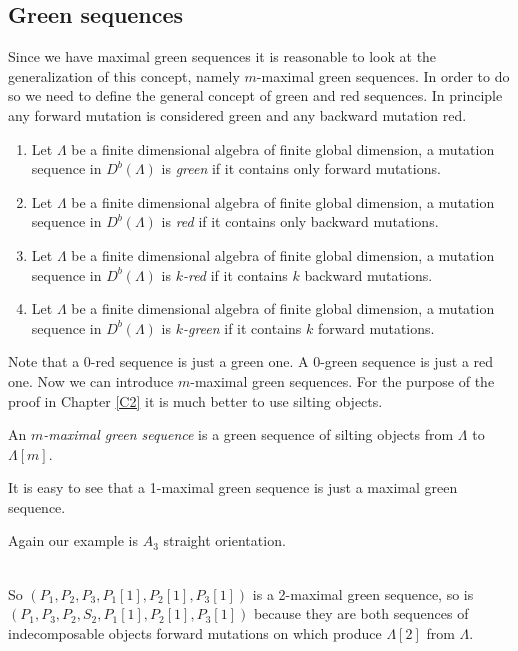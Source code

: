 \subsection{Green sequences}
\indent Since we have maximal green sequences it is reasonable to look at the generalization of this concept, namely $m$-maximal green sequences. In order to do so we need to define the general concept of green and red sequences. In principle any forward mutation is considered green and any backward mutation red.\\
\begin{definition}
\begin{enumerate}
\item Let $\Lambda$ be a finite dimensional algebra of finite global dimension, a mutation sequence in $D^b(\Lambda)$ is \textit{green} if it contains only forward mutations. 
\item Let $\Lambda$ be a finite dimensional algebra of finite global dimension, a mutation sequence in $D^b(\Lambda)$ is \textit{red} if it contains only backward mutations. 
\item Let $\Lambda$ be a finite dimensional algebra of finite global dimension, a mutation sequence in $D^b(\Lambda)$ is \textit{$k$-red} if it contains $k$ backward mutations. 
\item Let $\Lambda$ be a finite dimensional algebra of finite global dimension, a mutation sequence in $D^b(\Lambda)$ is \textit{$k$-green} if it contains $k$ forward mutations.
\end{enumerate}
\end{definition}
\indent Note that a $0$-red sequence is just a green one. A $0$-green sequence is just a red one. Now we can introduce $m$-maximal green sequences. For the purpose of the proof in Chapter \ref{C2} it is much better to use silting objects.\\
\begin{definition}
An \textit{$m$-maximal green sequence} is a green sequence of silting objects from $\Lambda$ to $\Lambda[m]$.
\end{definition}
\indent It is easy to see that a 1-maximal green sequence is just a maximal green sequence.\\
\begin{example}
\indent Again our example is $A_3$ straight orientation.\\
\\
\indent So $(P_1,P_2,P_3,P_1[1],P_2[1],P_3[1])$ is a 2-maximal green sequence, so is $(P_1,P_3,P_2,S_2,P_1[1],P_2[1],P_3[1])$ because they are both sequences of indecomposable objects forward mutations on which produce $\Lambda[2]$ from $\Lambda$. \\
\end{example}
